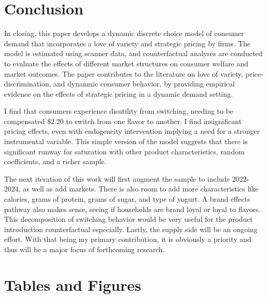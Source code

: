 \documentclass[11pt]{article}
\theoremstyle{definition}
\theoremstyle{remark}
\begin{document}
\section{Conclusion}

In closing, this paper develops a dynamic discrete choice model of consumer demand that incorporates a love of variety and strategic pricing by firms. The model is estimated using scanner data, and counterfactual analyses are conducted to evaluate the effects of different market structures on consumer welfare and market outcomes. The paper contributes to the literature on love of variety, price-discrimination, and dynanmic consumer behavior, by providing empirical evidence on the effects of strategic pricing in a dynamic demand setting. 

I find that consumers experience disutility from switching, needing to be compensated \$2.20 to switch from one flavor to another. I find insignificant pricing effects, even with endogeneity intervention implying a need for a stronger instrumental variable. This simple version of the model suggests that there is significant runway for saturation with other product characteristics, random coefficients, and a richer sample.

The next iteration of this work will first augment the sample to include 2022-2024, as well as add markets. There is also room to add more characteristics like calories, grams of protein, grams of sugar, and type of yogurt. A brand effects pathway also makes sense, seeing if households are brand loyal or loyal to flavors. This decomposition of switching behavior would be very useful for the product introduction counterfactual especially. Lastly, the supply side will be an ongoing effort. With that being my primary contribution, it is obviously a priority and thus will be a major focus of forthcoming research.

\newpage



\newpage
\section{Tables and Figures}
\end{document}
